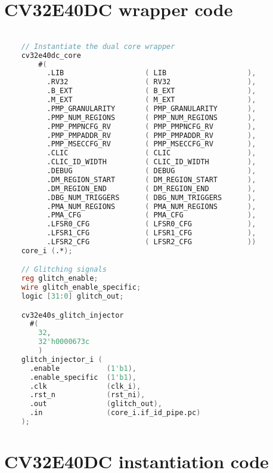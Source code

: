 \section{CV32E40DC wrapper code}
\label{app:dc_ins}

\begin{lstlisting}[caption={CV32E40DC wrapper code}, label=lst:dc_wrapper, language=verilog]

    // Instantiate the dual core wrapper 
    cv32e40dc_core
        #(
          .LIB                   ( LIB                   ),
          .RV32                  ( RV32                  ),
          .B_EXT                 ( B_EXT                 ),
          .M_EXT                 ( M_EXT                 ),
          .PMP_GRANULARITY       ( PMP_GRANULARITY       ),
          .PMP_NUM_REGIONS       ( PMP_NUM_REGIONS       ),
          .PMP_PMPNCFG_RV        ( PMP_PMPNCFG_RV        ),
          .PMP_PMPADDR_RV        ( PMP_PMPADDR_RV        ),
          .PMP_MSECCFG_RV        ( PMP_MSECCFG_RV        ),
          .CLIC                  ( CLIC                  ),
          .CLIC_ID_WIDTH         ( CLIC_ID_WIDTH         ),
          .DEBUG                 ( DEBUG                 ),
          .DM_REGION_START       ( DM_REGION_START       ),
          .DM_REGION_END         ( DM_REGION_END         ),
          .DBG_NUM_TRIGGERS      ( DBG_NUM_TRIGGERS      ),
          .PMA_NUM_REGIONS       ( PMA_NUM_REGIONS       ),
          .PMA_CFG               ( PMA_CFG               ),
          .LFSR0_CFG             ( LFSR0_CFG             ),
          .LFSR1_CFG             ( LFSR1_CFG             ),
          .LFSR2_CFG             ( LFSR2_CFG             ))
    core_i (.*);

    // Glitching signals 
    reg glitch_enable;
    wire glitch_enable_specific;
    logic [31:0] glitch_out;

    cv32e40s_glitch_injector 
      #(
        32,
        32'h0000673c
        )
    glitch_injector_i (
      .enable           (1'b1),
      .enable_specific  (1'b1),
      .clk              (clk_i),
      .rst_n            (rst_ni),
      .out              (glitch_out),
      .in               (core_i.if_id_pipe.pc)
    );

\end{lstlisting}

\section{CV32E40DC instantiation code}
\label{app:skip_asm}

